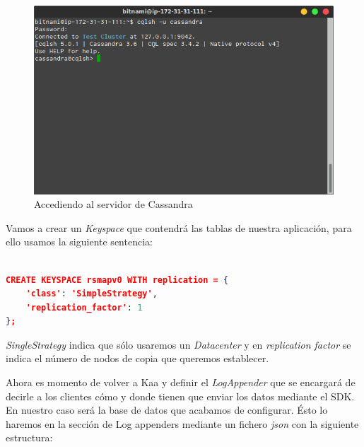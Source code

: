 \begin{figure}[!ht]
  \begin{center}
    \includegraphics[scale=0.55]{../images/cassandra/3.png}
		\caption{Accediendo al servidor de Cassandra}
    \label{fig:kaa}
	\end{center}
\end{figure}

\newpage

Vamos a crear un \textit{Keyspace} que contendrá las tablas de nuestra aplicación, para ello usamos la siguiente sentencia:

\begin{lstlisting}[language=json,caption={Keyspace en Cassandra},label={lst:json_personal}]

CREATE KEYSPACE rsmapv0 WITH replication = {
	'class': 'SimpleStrategy',
	'replication_factor': 1
};

\end{lstlisting}

\textit{SingleStrategy} indica que sólo usaremos un \textit{Datacenter} y en \textit{replication factor} se indica el número de nodos de copia que queremos establecer.

\newpage

Ahora es momento de volver a Kaa y definir el \textit{LogAppender} que se encargará de decirle a los clientes cómo y donde tienen que enviar los datos mediante el SDK. En nuestro caso será la base de datos que acabamos de configurar. Ésto lo haremos en la sección de Log appenders mediante un fichero \textit{json} con la siguiente estructura:


